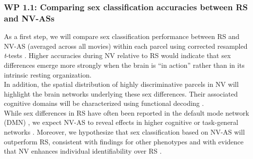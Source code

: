 \documentclass[11pt,a4paper]{article}
\begin{document}
\subsubsection*{WP 1.1:  Comparing sex classification accuracies between RS and NV-ASs}
As a first step, we will compare sex classification performance between RS and NV-AS (averaged across all movies) 
within each parcel using corrected resampled \textit{t}-tests \parencite{nadeauInferenceGeneralizationError2003a}. 
Higher accuracies during NV relative to RS would indicate that sex differences emerge more strongly when the brain 
is “in action” rather than in its intrinsic resting organization.\\  
In addition, the spatial distribution of highly discriminative parcels in NV will highlight the brain 
networks underlying these sex differences. Their associated cognitive domains will be characterized using 
functional decoding \parencite{foxMetaanalysisHumanNeuroimaging2014a}.\\  
While sex differences in RS have often been reported in the default mode network (DMN) 
\parencite{weisSexClassificationResting2020a,zhangFunctionalConnectivityPredicts2018}, 
we expect NV-AS to reveal effects in higher cognitive or task-general networks 
\parencite{hugdahlExistenceGeneralizedNonspecific2015a}. 
Moreover, we hypothesize that sex classification based on NV-AS will outperform RS, 
consistent with findings for other phenotypes 
\parencite{finnCanBrainState2017a,vanderwalIndividualDifferencesFunctional2017} 
and with evidence that NV enhances individual identifiability over RS \parencite{krollNaturalisticViewingIncreases2023}.  
\end{document}
